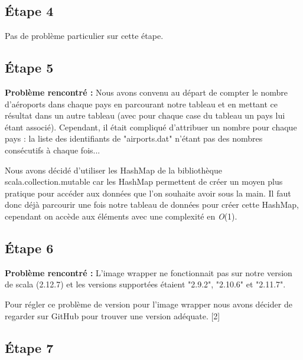 \documentclass{article}
\begin{document}
\subsection{Étape 4} 


Pas de problème particulier sur cette étape.


\subsection{Étape 5}


\textbf{Problème rencontré :} \newline
 Nous avons convenu au départ de compter le nombre d'aéroports dans chaque pays en parcourant notre tableau et en mettant ce résultat dans un autre tableau (avec pour chaque case du tableau un pays lui étant associé). Cependant, il était compliqué d'attribuer un nombre pour chaque pays : la liste des identifiants de "airports.dat" n'étant pas des nombres consécutifs à chaque fois... 
 
\vspace{1\baselineskip}

 \newline
Nous avons décidé d'utiliser les HashMap de la bibliothèque scala.collection.mutable car les HashMap permettent de créer un moyen plus pratique pour accéder aux données que l'on souhaite avoir sous la main. Il faut donc déjà parcourir une fois notre tableau de données pour créer cette HashMap, cependant on accède aux éléments avec une complexité en \textit{O}(1).

\vspace{1\baselineskip}

\subsection{Étape 6} 


\textbf{Problème rencontré :} \newline
L'image wrapper ne fonctionnait pas sur notre version de scala (2.12.7) et les versions supportées étaient "2.9.2", "2.10.6" et "2.11.7".

\vspace{1\baselineskip}

 \newline
Pour régler ce problème de version pour l'image wrapper nous avons décider de regarder sur GitHub pour trouver une version adéquate. [2]


\subsection{Étape 7}
\end{document}
